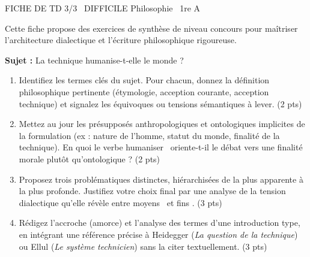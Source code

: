 \documentclass[11pt]{article}
\begin{document}
\begin{tcolorbox}[enhanced,colback=popink,colframe=popink,arc=10pt,boxrule=0pt,left=12pt,right=12pt,top=9pt,bottom=9pt]
{\color{white}\popxbold\small FICHE DE TD 3/3 \textbullet\ DIFFICILE \hfill Philosophie \textbullet\ 1re A\par}
\end{tcolorbox}
\vspace{4pt}
Cette fiche propose des exercices de synthèse de niveau concours pour maîtriser l'architecture dialectique et l'écriture philosophique rigoureuse.

\begin{exercice}
\textbf{Sujet :} \og La technique humanise-t-elle le monde ? \fg

\begin{enumerate}
    \item Identifiez les termes clés du sujet. Pour chacun, donnez la définition philosophique pertinente (étymologie, acception courante, acception technique) et signalez les équivoques ou tensions sémantiques à lever. (2 pts)
    \item Mettez au jour les présupposés anthropologiques et ontologiques implicites de la formulation (ex : nature de l'homme, statut du monde, finalité de la technique). En quoi le verbe \og humaniser \fg\ oriente-t-il le débat vers une finalité morale plutôt qu'ontologique ? (2 pts)
    \item Proposez trois problématiques distinctes, hiérarchisées de la plus apparente à la plus profonde. Justifiez votre choix final par une analyse de la tension dialectique qu'elle révèle entre \og moyens \fg\ et \og fins \fg. (3 pts)
    \item Rédigez l'accroche (amorce) et l'analyse des termes d'une introduction type, en intégrant une référence précise à Heidegger (\textit{La question de la technique}) ou Ellul (\textit{Le système technicien}) sans la citer textuellement. (3 pts)
\end{enumerate}
\end{exercice}
\end{document}

